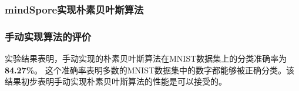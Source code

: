 \documentclass[12pt]{article}
\begin{document}







\subsubsection{mindSpore实现朴素贝叶斯算法}


\subsubsection{手动实现算法的评价}

实验结果表明，手动实现的朴素贝叶斯算法在MNIST数据集上的分类准确率为\textbf{84.27\%}。
这个准确率表明多数的MNIST数据集中的数字都能够被正确分类。该结果初步表明手动实现朴素贝叶斯算法的性能是可以接受的。
\end{document}
